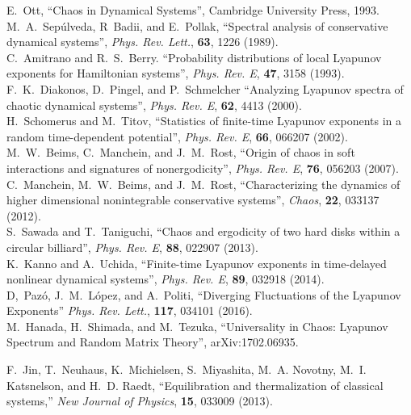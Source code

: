 \documentclass[a4paper, onecolumn]{revtex4-1}
\begin{document}
\begin{thebibliography}{1}
E.~Ott, ``Chaos in Dynamical Systems'', Cambridge University Press,  1993.
%
\\ 
%
M.~A.~Sep\'ulveda, R~Badii, and E.~Pollak, 
``Spectral analysis of conservative dynamical systems'', 
{\em Phys. Rev. Lett.}, {\bf 63}, 1226 (1989). 
%
\\ 
%
C.~Amitrano and R.~S.~Berry. 
``Probability distributions of local Lyapunov exponents for Hamiltonian systems'', 
{\em Phys. Rev. E}, {\bf 47}, 3158 (1993). 
%
\\ 
%
F.~K.~Diakonos, D.~Pingel, and P.~Schmelcher
``Analyzing Lyapunov spectra of chaotic dynamical systems'', 
{\em Phys. Rev. E}, {\bf 62}, 4413 (2000).
%
\\ 
%
H.~Schomerus and M.~Titov, 
``Statistics of finite-time Lyapunov exponents in a random time-dependent potential'', 
{\em Phys. Rev. E}, {\bf 66}, 066207 (2002). 
%
\\ 
%
M.~W.~Beims, C.~Manchein, and J.~M.~Rost, 
``Origin of chaos in soft interactions and signatures of nonergodicity'', 
{\em Phys. Rev. E}, {\bf 76}, 056203 (2007).
%
\\ 
%
C.~Manchein, M.~W.~Beims, and J.~M.~Rost, ``Characterizing the dynamics of higher dimensional
nonintegrable conservative systems'', {\em Chaos}, {\bf 22}, 033137 (2012).
%
\\ 
%
S.~Sawada and T.~Taniguchi, 
``Chaos and ergodicity of two hard disks within a circular billiard'', 
{\em Phys. Rev. E}, {\bf 88}, 022907 (2013). 
%
\\ 
%
K.~Kanno and A.~Uchida, ``Finite-time Lyapunov exponents in time-delayed nonlinear dynamical
systems'',  {\em Phys. Rev. E}, {\bf 89}, 032918 (2014). 
%
\\ 
%
D,~Paz\'o, J.~M.~L\'opez, and A.~Politi, 
``Diverging Fluctuations of the Lyapunov Exponents'' 
{\em Phys. Rev. Lett.},  {\bf 117}, 034101 (2016). 
%
\\ 
%
M.~Hanada, H.~Shimada, and M.~Tezuka, ``Universality in Chaos: Lyapunov Spectrum and
Random Matrix Theory'', arXiv:1702.06935. 



F.~Jin, T.~Neuhaus, K.~Michielsen, S.~Miyashita, M.~A. Novotny, M.~I.
  Katsnelson, and H.~D. Raedt, ``Equilibration and thermalization of classical
  systems,'' {\em New Journal of Physics}, {\bf 15}, 033009 (2013).




\end{thebibliography}
\end{document}
